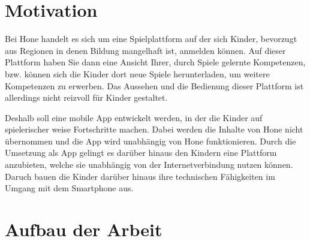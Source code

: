 \section{Motivation}
Bei Hone handelt es sich um eine Spielplattform auf der sich Kinder, bevorzugt aus Regionen in denen Bildung mangelhaft ist, anmelden können. Auf dieser Plattform haben Sie dann eine Ansicht Ihrer, durch Spiele gelernte Kompetenzen, bzw. können sich die Kinder dort neue Spiele herunterladen, um weitere Kompetenzen zu erwerben. Das Aussehen und die Bedienung dieser Plattform ist allerdings nicht reizvoll für Kinder gestaltet. 

Deshalb soll eine mobile App entwickelt werden, in der die Kinder auf spielerischer weise Fortschritte machen. Dabei werden die Inhalte von Hone nicht übernommen und die App wird unabhängig von Hone funktionieren. Durch die Umsetzung als App gelingt es darüber hinaus den Kindern eine Plattform anzubieten, welche sie unabhängig von der Internetverbindung nutzen können. Daruch bauen die Kinder darüber hinaus ihre technischen Fähigkeiten im Umgang mit dem Smartphone aus.




\section{Aufbau der Arbeit}

